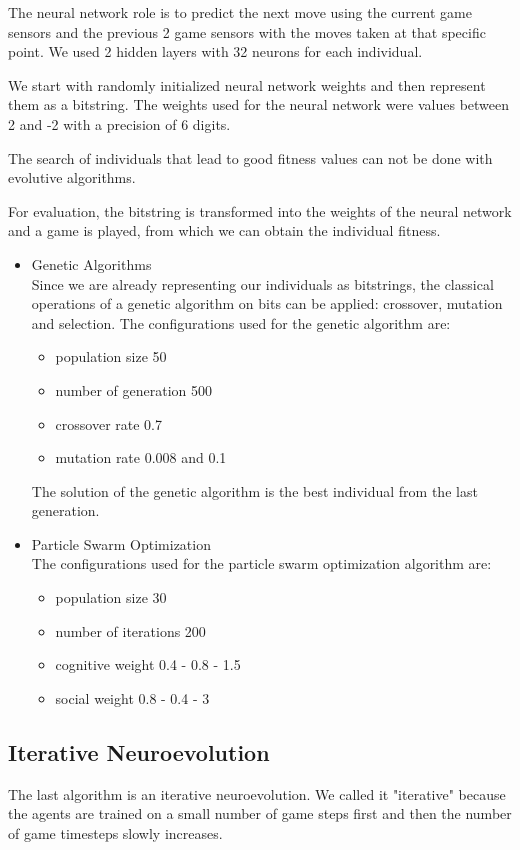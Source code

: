\documentclass[conference]{IEEEtran}
\begin{document}
The neural network role is to predict the next move using the current game sensors and
the previous 2 game sensors with the moves taken at that specific point.
We used 2 hidden layers with 32 neurons for each individual.

We start with randomly initialized neural network weights and then represent them as a bitstring.
The weights used for the neural network were values between 2 and -2 with a precision of 6 digits.

The search of individuals that lead to good fitness values can not be done with evolutive algorithms.

For evaluation, the bitstring is transformed into the weights of the neural network and a game is played,
from which we can obtain the individual fitness.

\begin{itemize}
    \item Genetic Algorithms\cite{genetic_algorithm} \\
    Since we are already representing our individuals as bitstrings, the classical operations of a
genetic algorithm on bits can be applied: crossover, mutation and selection.
    The configurations used for the genetic algorithm are:
    \begin{itemize}
        \item population size 50
        \item number of generation 500
        \item crossover rate 0.7
        \item mutation rate 0.008 and 0.1
    \end{itemize}
    The solution of the genetic algorithm is the best individual from the last generation.
    \newpage
    \item Particle Swarm Optimization\cite{pso} \\
    The configurations used for the particle swarm optimization algorithm are:
    \begin{itemize}
        \item population size 30
        \item number of iterations 200
        \item cognitive weight 0.4 - 0.8 - 1.5
        \item social weight 0.8 - 0.4 - 3
    \end{itemize}
\end{itemize}

\subsection{Iterative Neuroevolution}\label{subsec:iterative-neuroevolution}
The last algorithm is an iterative neuroevolution.
We called it "iterative" because the agents are trained on a small number of game steps
first and then the number of game timesteps slowly increases.
\end{document}

